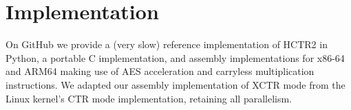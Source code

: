 \documentclass[hctr2.tex]{subfiles}
\begin{document}
\section{Implementation}\label{implementation}
On GitHub
we provide a (very slow) reference implementation of HCTR2 in Python,
a portable C implementation,
and assembly implementations for x86-64 and ARM64
making use of AES acceleration and carryless multiplication instructions.
We adapted our assembly implementation of XCTR mode from
the Linux kernel's CTR mode implementation, retaining all parallelism.
\end{document}
